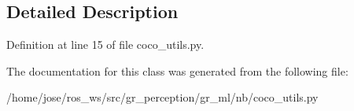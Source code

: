 \subsection{Detailed Description}


Definition at line 15 of file coco\+\_\+utils.\+py.



The documentation for this class was generated from the following file\+:\begin{DoxyCompactItemize}
\item 
/home/jose/ros\+\_\+ws/src/gr\+\_\+perception/gr\+\_\+ml/nb/coco\+\_\+utils.\+py\end{DoxyCompactItemize}
